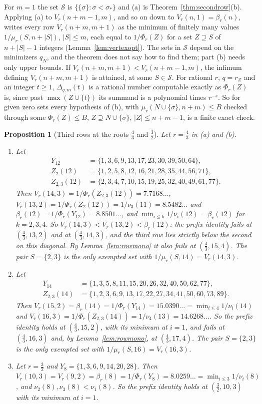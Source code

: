 \documentclass[11pt]{article}
\newtheorem{proposition}[theorem]{Proposition}
\begin{document}
For $m=1$ the set $\mathcal S$ is $\{\{\sigma\}:\sigma<\sigma_*\}$ and (a) is
Theorem~\ref{thm:secondrow}(b).  Applying (a) to $V_r(n+m-1,m)$, and so on
down to $V_r(n,1)=\beta_r(n)$, writes every row $V_r(n+m,m+1)$ as the
minimum of finitely many values $1/\mu_r(S,n+|S|)$, $|S|\le m$, each equal
to $1/\Phi_r(Z)$ for a set $Z\supseteq S$ of $n+|S|-1$ integers
(Lemma~\ref{lem:vertexopt}).  The sets in $\mathcal S$ depend on the
minimizers $q_N$, and the theorem does not say how to find them; part (b)
needs only upper bounds.  If $V_r(n+m,m+1)<V_r(n+m-1,m)$, the infimum
defining $V_r(n+m,m+1)$ is attained, at some $S\in\mathcal S$.  For rational
$r$, $q=r_Z$ and an integer $t\ge1$, $\Delta_{q,m}(t)$ is a rational number
computable exactly
as $\Phi_r(Z)$ is, since past $\max(Z\cup\{t\})$ its summand is a polynomial
times $r^{-s}$.  So for given zero sets every hypothesis of (b), with
$\mu_r(N\cup\{\sigma\},n+m)\le B$ checked through some $\Phi_r(Z)\le B$,
$Z\supseteq N\cup\{\sigma\}$, $|Z|\le n+m-1$, is a finite exact check.

\begin{proposition}[Third rows at the roots $\frac43$ and $\frac32$]\label{prop:thirdrowexact}
Let $r=\frac43$ in (a) and (b).
\begin{enumerate}
\item[(a)] Let
\begin{align*}
  Y_{12}&=\{1,3,6,9,13,17,23,30,39,50,64\},\\
  Z_2(12)&=\{1,2,5,8,12,16,21,28,35,44,56,71\},\\
  Z_{2,3}(12)&=\{2,3,4,7,10,15,19,25,32,40,49,61,77\}.
\end{align*}
Then $V_r(14,3)=1/\Phi_r(Z_{2,3}(12))=7.7168\ldots$,
$V_r(13,2)=1/\Phi_r(Z_2(12))=1/\nu_3(11)=8.5482\ldots$ and
$\beta_r(12)=1/\Phi_r(Y_{12})=8.8501\ldots$, and
$\min_{i\le k}1/\nu_i(12)=\beta_r(12)$ for $k=2,3,4$.  So
$V_r(14,3)<V_r(13,2)<\beta_r(12)$: the prefix identity fails at
$(\frac43,13,2)$ and at $(\frac43,14,3)$, and the third row lies strictly
below the second on this diagonal.  By Lemma~\ref{lem:rowmono} it also
fails at $(\frac43,15,4)$.  The pair $S=\{2,3\}$ is the only
exempted set with $1/\mu_r(S,14)=V_r(14,3)$.
\item[(b)] Let
\begin{align*}
  Y_{14}&=\{1,3,5,8,11,15,20,26,32,40,50,62,77\},\\
  Z_{2,3}(14)&=\{1,2,3,6,9,13,17,22,27,34,41,50,60,73,89\}.
\end{align*}
Then $V_r(15,2)=\beta_r(14)=1/\Phi_r(Y_{14})=15.0390\ldots=\min_{i\le4}1/\nu_i(14)$
and $V_r(16,3)=1/\Phi_r(Z_{2,3}(14))=1/\nu_4(13)=14.6268\ldots$.  So the
prefix identity holds at $(\frac43,15,2)$, with its minimum at $i=1$, and
fails at $(\frac43,16,3)$ and, by Lemma~\ref{lem:rowmono}, at
$(\frac43,17,4)$.  The pair $S=\{2,3\}$ is the only exempted set
with $1/\mu_r(S,16)=V_r(16,3)$.
\item[(c)] Let $r=\frac32$ and $Y_8=\{1,3,6,9,14,20,28\}$.  Then
$V_r(10,3)=V_r(9,2)=\beta_r(8)=1/\Phi_r(Y_8)=8.0259\ldots=\min_{i\le3}1/\nu_i(8)$,
and $\nu_2(8),\nu_3(8)<\nu_1(8)$.  So the prefix identity holds at
$(\frac32,10,3)$ with its minimum at $i=1$.
\end{enumerate}
\end{proposition}
\end{document}
